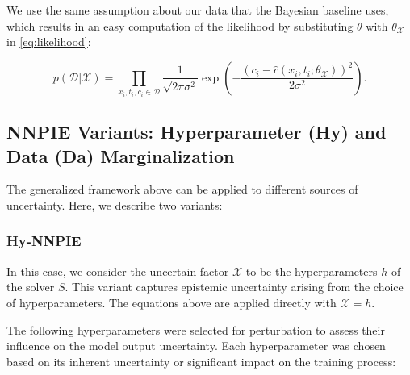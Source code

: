We use the same assumption about our data that the Bayesian baseline uses, which results in an easy computation of the likelihood by substituting $\theta$ with $\theta_{\mathcal{X}}$ in \cref{eq:likelihood}:

\begin{equation*}
p(\mathcal{D} | \mathcal{X}) = \prod_{x_i, t_i, c_i \in \mathcal{D}} \frac{1}{\sqrt{2\pi \sigma^2}} \exp \left( -\frac{(c_i - \hat{c}(x_i,t_i;\theta_{\mathcal{X}}))^2}{2\sigma^2} \right) .
\end{equation*}

\subsection{NNPIE Variants: Hyperparameter (Hy) and Data (Da) Marginalization}

The generalized framework above can be applied to different sources of uncertainty. Here, we describe two variants:

\subsubsection{Hy-NNPIE}

In this case, we consider the uncertain factor $\mathcal{X}$ to be the hyperparameters $h$ of the solver $S$. This variant captures epistemic uncertainty arising from the choice of hyperparameters. The equations above are applied directly with $\mathcal{X} = h$.

The following hyperparameters were selected for perturbation to assess their influence on the model output uncertainty. Each hyperparameter was chosen based on its inherent uncertainty or significant impact on the training process:

